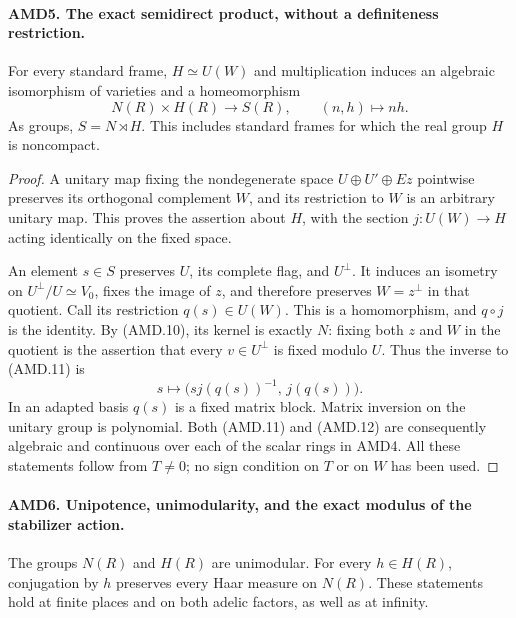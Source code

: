 \paragraph{AMD5. The exact semidirect product, without a definiteness restriction.}
\label{claim:AMD5}
For every standard frame, \(H\simeq U(W)\) and multiplication
induces an algebraic isomorphism of varieties and a homeomorphism
\[
                    N(R)\times H(R)\longrightarrow S(R),
                    \qquad(n,h)\longmapsto nh.
 \tag{AMD.11}
\]
As groups, \(S=N\rtimes H\).  This includes standard frames
for which the real group \(H\) is noncompact.

\begin{proof}
A unitary map fixing the nondegenerate space
\(U\oplus U'\oplus Ez\) pointwise preserves its orthogonal
complement \(W\), and its restriction to \(W\) is an arbitrary
unitary map.  This proves the assertion about \(H\), with the
section \(j:U(W)\to H\) acting identically on the fixed space.

An element \(s\in S\) preserves \(U\), its complete flag,
and \(U^\perp\).  It induces an isometry on
\(U^\perp/U\simeq V_0\), fixes the image of \(z\), and
therefore preserves \(W=z^\perp\) in that quotient.  Call its
restriction \(q(s)\in U(W)\).  This is a homomorphism, and
\(q\circ j\) is the identity.  By (AMD.10), its kernel is
exactly \(N\): fixing both \(z\) and \(W\) in the quotient
is the assertion that every \(v\in U^\perp\) is fixed
modulo \(U\).  Thus the inverse to (AMD.11) is
\[
       s\longmapsto\bigl(sj(q(s))^{-1},\,j(q(s))\bigr).
 \tag{AMD.12}
\]
In an adapted basis \(q(s)\) is a fixed matrix block.  Matrix
inversion on the unitary group is polynomial.  Both (AMD.11)
and (AMD.12) are consequently algebraic and continuous over
each of the scalar rings in AMD4.  All these statements follow
from \(T\ne0\); no sign condition on \(T\) or on \(W\)
has been used.
\end{proof}

\paragraph{AMD6. Unipotence, unimodularity, and the exact modulus of the stabilizer action.}
\label{claim:AMD6}
The groups \(N(R)\) and \(H(R)\) are unimodular.  For every
\(h\in H(R)\), conjugation by \(h\) preserves every Haar
measure on \(N(R)\).  These statements hold at finite places
and on both adelic factors, as well as at infinity.

